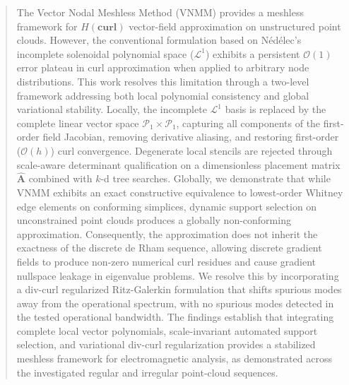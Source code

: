 \documentclass[preprint,12pt]{elsarticle}
\begin{document}
\begin{frontmatter}


    \begin{abstract}
        The Vector Nodal Meshless Method (VNMM) provides a meshless framework for $H(\mathbf{curl})$ vector-field approximation on unstructured point clouds. However, the conventional formulation based on N\'ed\'elec's incomplete solenoidal polynomial space ($\mathcal{L}^1$) exhibits a persistent $\mathcal{O}(1)$ error plateau in curl approximation when applied to arbitrary node distributions. This work resolves this limitation through a two-level framework addressing both local polynomial consistency and global variational stability. Locally, the incomplete $\mathcal{L}^1$ basis is replaced by the complete linear vector space $\mathcal{P}_1 \times \mathcal{P}_1$, capturing all components of the first-order field Jacobian, removing derivative aliasing, and restoring first-order ($\mathcal{O}(h)$) curl convergence. Degenerate local stencils are rejected through scale-aware determinant qualification on a dimensionless placement matrix $\widehat{\mathbf{A}}$ combined with $k$-d tree searches. Globally, we demonstrate that while VNMM exhibits an exact constructive equivalence to lowest-order Whitney edge elements on conforming simplices, dynamic support selection on unconstrained point clouds produces a globally non-conforming approximation. Consequently, the approximation does not inherit the exactness of the discrete de Rham sequence, allowing discrete gradient fields to produce non-zero numerical curl residues and cause gradient nullspace leakage in eigenvalue problems. We resolve this by incorporating a div-curl regularized Ritz-Galerkin formulation that shifts spurious modes away from the operational spectrum, with no spurious modes detected in the tested operational bandwidth. The findings establish that integrating complete local vector polynomials, scale-invariant automated support selection, and variational div-curl regularization provides a stabilized meshless framework for electromagnetic analysis, as demonstrated across the investigated regular and irregular point-cloud sequences.
    \end{abstract}


\end{frontmatter}
\end{document}
